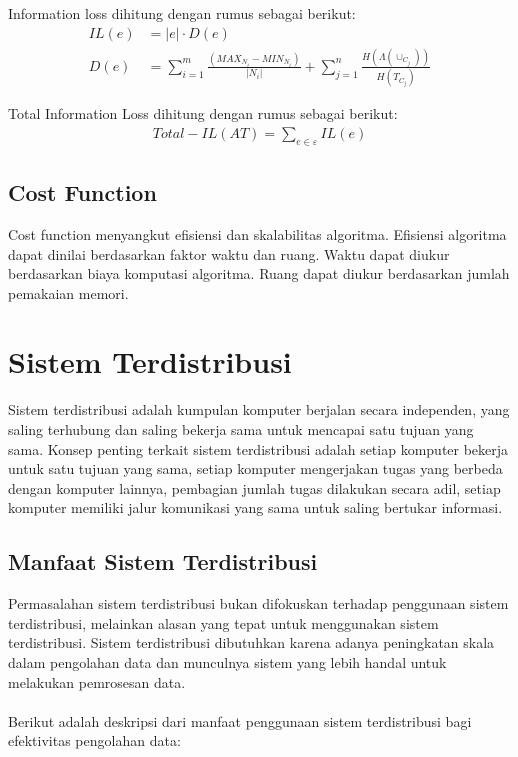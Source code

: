 \noindent Information loss dihitung dengan rumus sebagai berikut:
\begin{align}
IL(e)&= |e| \cdot D(e) \\
D(e) &= \sum_{i=1}^{m} \frac{(MAX_{N_i} - MIN_{N_i})}{|N_i|} + \sum_{j=1}^{n}\frac{H(\Lambda(\cup_{C_j}))}{H(T_{C_j})}
\end{align}

\noindent Total Information Loss dihitung dengan rumus sebagai berikut:
\begin{align}
Total-IL(AT) = \sum_{e \in \varepsilon}^{}  IL(e)
\end{align}


\subsection{Cost Function} 
Cost function menyangkut efisiensi dan skalabilitas algoritma. Efisiensi algoritma dapat dinilai berdasarkan faktor waktu dan ruang. Waktu dapat diukur berdasarkan biaya komputasi algoritma. Ruang dapat diukur berdasarkan jumlah pemakaian memori.
 
\section{Sistem Terdistribusi}
Sistem terdistribusi adalah kumpulan komputer berjalan secara independen, yang saling terhubung dan saling bekerja sama untuk mencapai satu tujuan yang sama. Konsep penting terkait sistem terdistribusi adalah setiap komputer bekerja untuk satu tujuan yang sama, setiap komputer mengerjakan tugas yang berbeda dengan komputer lainnya, pembagian jumlah tugas dilakukan secara adil, setiap komputer memiliki jalur komunikasi yang sama untuk saling bertukar informasi.

\subsection{Manfaat Sistem Terdistribusi}
Permasalahan sistem terdistribusi bukan difokuskan terhadap penggunaan sistem terdistribusi, melainkan alasan yang tepat untuk menggunakan sistem terdistribusi. Sistem terdistribusi dibutuhkan karena adanya peningkatan skala dalam pengolahan data dan munculnya sistem yang lebih handal untuk melakukan pemrosesan data. 
\\\\
Berikut adalah deskripsi dari manfaat penggunaan sistem terdistribusi bagi efektivitas pengolahan data:

